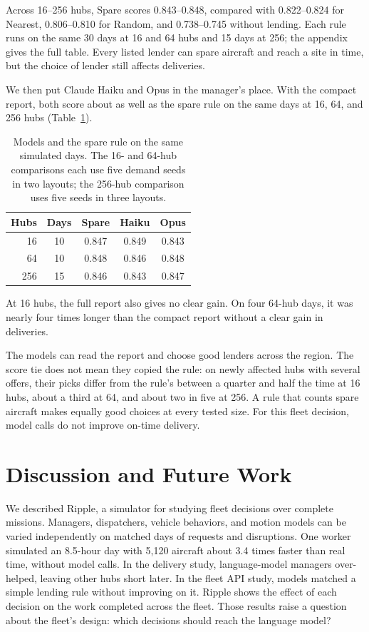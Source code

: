 \documentclass[letterpaper,10pt,conference]{ieeeconf}
\begin{document}
Across 16--256 hubs, Spare scores 0.843--0.848, compared with
0.822--0.824 for Nearest, 0.806--0.810 for Random, and 0.738--0.745
without lending. Each rule runs on the same 30 days at 16 and 64 hubs
and 15 days at 256; the appendix gives the full table. Every listed
lender can spare aircraft and reach a site in time, but the choice of
lender still affects deliveries.

We then put Claude Haiku and Opus in the manager's place. With the
compact report, both score about as well as the spare rule on the same
days at 16, 64, and 256 hubs (Table~\ref{tab:api-models}).

\begin{table}[t]
\caption{Models and the spare rule on the same simulated days. The 16-
and 64-hub comparisons each use five demand seeds in two layouts; the
256-hub comparison uses five seeds in three layouts.}
\label{tab:api-models}
\centering
\footnotesize
\begin{tabular}{@{}rcccc@{}}
\toprule
Hubs & Days & Spare & Haiku & Opus \\
\midrule
16 & 10 & 0.847 & 0.849 & 0.843 \\
64 & 10 & 0.848 & 0.846 & 0.848 \\
256 & 15 & 0.846 & 0.843 & 0.847 \\
\bottomrule
\end{tabular}
\end{table}

At 16 hubs, the full report also gives no clear gain. On
four 64-hub days, it was nearly four times longer than the compact
report without a clear gain in deliveries.

The models can read the report and choose good lenders across the
region. The score tie does not mean they copied the rule: on newly
affected hubs with several offers, their picks differ from the rule's
between a quarter and half the time at 16 hubs, about a third at 64,
and about two in five at 256. A rule that counts spare aircraft makes
equally good choices at every tested size. For this fleet decision,
model calls do not improve on-time delivery.

\section{Discussion and Future Work}
\label{sec:discussion}

We described Ripple, a simulator for studying fleet decisions over
complete missions. Managers, dispatchers, vehicle behaviors, and motion
models can be varied independently on matched days of requests and
disruptions. One worker simulated an 8.5-hour day with 5,120 aircraft
about 3.4 times faster than real time, without model calls. In the
delivery study, language-model managers over-helped, leaving other hubs
short later. In the fleet API study, models matched a simple lending
rule without improving on it. Ripple shows the effect of each decision
on the work completed across the fleet. Those results raise a question
about the fleet's design: which decisions should reach the language
model?
\end{document}
